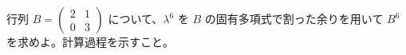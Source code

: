 
行列 $B = \begin{pmatrix} 2 & 1 \\ 0 & 3 \end{pmatrix}$ について、$\lambda^{6}$ を $B$ の固有多項式で割った余りを用いて $B^{6}$ を求めよ。計算過程を示すこと。
